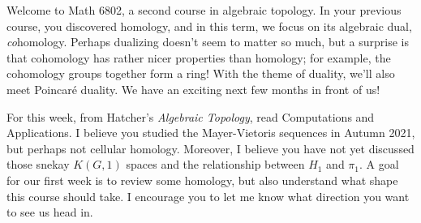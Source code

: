 \documentclass{homework}
\author{Jim Fowler}
\date{Week 1: Homology}
\begin{document}
\maketitle

Welcome to Math 6802, a second course in algebraic topology.  In your
previous course, you discovered homology, and in this term, we focus
on its algebraic dual, \textit{co}homology.  Perhaps dualizing doesn't
seem to matter so much, but a surprise is that cohomology has rather
nicer properties than homology; for example, the cohomology groups
together form a ring!  With the theme of duality, we'll also meet
Poincar\'e duality.  We have an exciting next few months in front of
us!

For this week, from Hatcher's \textit{Algebraic Topology}, read
 Computations and Applications.  I believe you studied
the Mayer-Vietoris sequences in Autumn 2021, but perhaps not cellular
homology.  Moreover, I believe you have not yet discussed those snekay
$K(G,1)$ spaces and the relationship between $H_1$ and $\pi_1$.  A
goal for our first week is to review some homology, but also
understand what shape this course should take.  I encourage you to let
me know what direction you want to see us head in.
\end{document}
